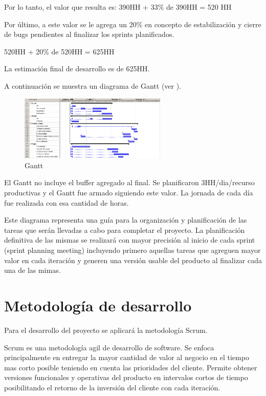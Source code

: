\documentclass[12pt,a4paper]{article}
\begin{document}
	Por lo tanto, el valor que resulta es: 390HH + 33\% de 390HH = 520 HH

	Por último, a este valor se le agrega un 20\% en concepto de estabilización y cierre de bugs pendientes al finalizar los sprints planificados.

	520HH + 20\% de 520HH = 625HH

	La estimación final de desarrollo es de 625HH.

	A continuación se muestra un diagrama de Gantt (ver \cite{gantt}).

	\begin{figure}[H]
		\begin{center}
			\includegraphics[width=7cm]{gantt.png}
			\caption{\label{gantt} Gantt }
		\end{center}
	\end{figure}

	El Gantt no incluye el buffer agregado al final. Se planificaron 3HH/dia/recurso productivas y el Gantt fue armado siguiendo este valor. La jornada de cada día fue realizada con esa cantidad de horas.

	Este diagrama representa una guía para la organización y planificación de las tareas que serán llevadas a cabo para completar el proyecto. La planificación definitiva de las mismas se realizará con mayor precisión al inicio de cada sprint (sprint planning meeting) incluyendo primero aquellas tareas que agreguen mayor valor en cada iteración y generen una versión usable del producto al finalizar cada una de las mimas.

	\section{Metodología de desarrollo}
	
	Para el desarrollo del proyecto se aplicará la metodología Scrum.

	Scrum es una metodología agil de desarrollo de software. Se enfoca principalmente en entregar la mayor cantidad de valor al negocio en el tiempo mas corto posible teniendo en cuenta las prioridades del cliente. Permite obtener versiones funcionales y operativas del producto en intervalos cortos de tiempo posibilitando el retorno de la inversión del cliente con cada iteración.
	
\end{document}
